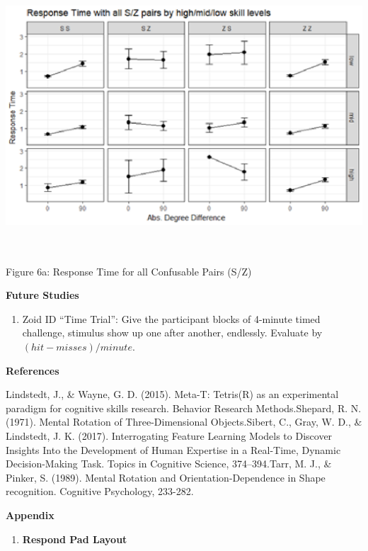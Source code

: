 \documentclass{article}
\begin{document}
	\noindent \includegraphics*[width=6.49in, height=4.00in, keepaspectratio=false]{image24}
	
	\noindent Figure 6a: Response Time for all Confusable Pairs (S/Z)
	
	\noindent \textbf{Future Studies}
	
	\begin{enumerate}
		\item \textbf{ }Zoid ID ``Time Trial'': Give the participant blocks of 4-minute timed challenge, stimulus show up one after another, endlessly. Evaluate by $(hit-misses)/minute$.
	\end{enumerate}
	
	\noindent \textbf{References}
	
	\noindent Lindstedt, J., \& Wayne, G. D. (2015). Meta-T: Tetris(R) as an experimental paradigm for cognitive skills research. Behavior Research Methods.Shepard, R. N. (1971). Mental Rotation of Three-Dimensional Objects.Sibert, C., Gray, W. D., \& Lindstedt, J. K. (2017). Interrogating Feature Learning Models to Discover Insights Into the Development of Human Expertise in a Real-Time, Dynamic Decision-Making Task. Topics in Cognitive Science, 374--394.Tarr, M. J., \& Pinker, S. (1989). Mental Rotation and Orientation-Dependence in Shape recognition. Cognitive Psychology, 233-282.
	
	\noindent \textbf{Appendix}
	
	\begin{enumerate}
		\item \textbf{ Respond Pad Layout}
	\end{enumerate}
	
\end{document}
